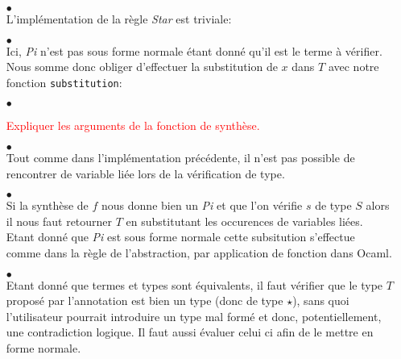 \documentclass {article}
\newcommand{\codefrom}[3]
           {}
\theoremstyle{definition}
\theoremstyle{remark}
\newcommand{\todo}[1]{\textcolor{red}{#1}}
\newcommand{\fun}[1]{\lstinline!#1!}
\begin{document}
\begin{itemize}
         
\item[$\bullet$] \\    

  L'implémentation de la règle \emph{Star} est triviale:
  
  \codefrom{dependent}{lambda}{check_star}

    
\item[$\bullet$] \\    
  
  Ici,  \emph{Pi} n'est pas sous forme normale étant donné qu'il est le terme
  à vérifier. Nous somme donc obliger d'effectuer la substitution de $x$ dans $T$
  avec notre fonction \fun{substitution}:
  
\codefrom{dependent}{lambda}{check_pi}

\item[$\bullet$] 

\todo{Expliquer les arguments de la fonction de synthèse.}

    \codefrom{dependent}{lambda}{synth_head}

\item[$\bullet$] \\    

  Tout comme dans l'implémentation précédente, il n'est pas possible de rencontrer de variable 
  liée lors de la vérification de type. 

  \codefrom{dependent}{lambda}{synth_var}


\item[$\bullet$] \\    

  Si la synthèse de $f$ nous donne bien un \emph{Pi} et que l'on vérifie $s$ de type
  $S$ alors il nous faut retourner $T$ en substitutant les occurences de variables liées.  
  Etant donné que \emph{Pi} est sous forme normale cette subsitution s'effectue
  comme dans la règle de l'abstraction, par application de fonction dans Ocaml.
  
  \codefrom{dependent}{lambda}{synth_app}


\item[$\bullet$] \\

Etant donné que termes et types sont équivalents, il faut vérifier que
le type $T$ proposé par l'annotation est bien un type (donc de type
$\star$), sans quoi l'utilisateur pourrait introduire un type mal
formé et donc, potentiellement, une contradiction logique. Il faut
aussi évaluer celui ci afin de le mettre en forme normale.
  
\codefrom{dependent}{lambda}{synth_ann}

\end{itemize}
\end{document}
